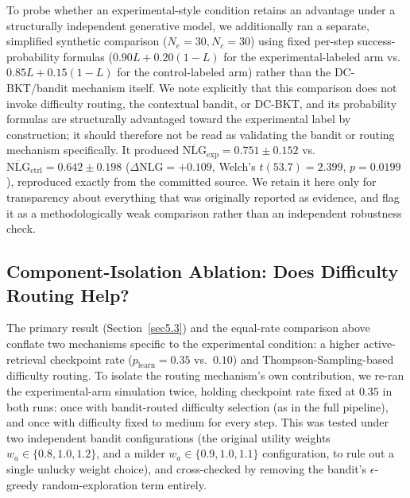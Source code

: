 \documentclass[pdflatex,sn-apa]{sn-jnl}
\begin{document}
To probe whether an experimental-style condition retains an advantage under a structurally independent generative model, we additionally ran a separate, simplified synthetic comparison ($N_e=30, N_c=30$) using fixed per-step success-probability formulas ($0.90L + 0.20(1-L)$ for the experimental-labeled arm vs.\ $0.85L + 0.15(1-L)$ for the control-labeled arm) rather than the DC-BKT/bandit mechanism itself. We note explicitly that this comparison does not invoke difficulty routing, the contextual bandit, or DC-BKT, and its probability formulas are structurally advantaged toward the experimental label by construction; it should therefore not be read as validating the bandit or routing mechanism specifically. It produced $\overline{\text{NLG}}_{\text{exp}} = 0.751 \pm 0.152$ vs.\ $\overline{\text{NLG}}_{\text{ctrl}} = 0.642 \pm 0.198$ ($\Delta\text{NLG}=+0.109$, Welch's $t(53.7)=2.399$, $p=0.0199$), reproduced exactly from the committed source. We retain it here only for transparency about everything that was originally reported as evidence, and flag it as a methodologically weak comparison rather than an independent robustness check.

\subsection{Component-Isolation Ablation: Does Difficulty Routing Help?}\label{sec5.5}

The primary result (Section~\ref{sec5.3}) and the equal-rate comparison above conflate two mechanisms specific to the experimental condition: a higher active-retrieval checkpoint rate ($p_{\text{learn}}=0.35$ vs.\ $0.10$) and Thompson-Sampling-based difficulty routing. To isolate the routing mechanism's own contribution, we re-ran the experimental-arm simulation twice, holding checkpoint rate fixed at $0.35$ in both runs: once with bandit-routed difficulty selection (as in the full pipeline), and once with difficulty fixed to medium for every step. This was tested under two independent bandit configurations (the original utility weights $w_a \in \{0.8, 1.0, 1.2\}$, and a milder $w_a \in \{0.9, 1.0, 1.1\}$ configuration, to rule out a single unlucky weight choice), and cross-checked by removing the bandit's $\epsilon$-greedy random-exploration term entirely.
\end{document}
